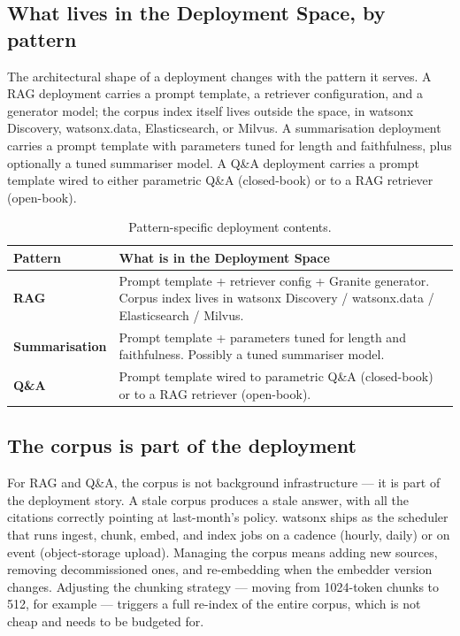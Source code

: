 \subsection{What lives in the Deployment Space, by pattern}

The architectural shape of a deployment changes with the pattern it serves. A RAG deployment carries a prompt template, a retriever configuration, and a generator model; the corpus index itself lives outside the space, in watsonx Discovery, watsonx.data, Elasticsearch, or Milvus. A summarisation deployment carries a prompt template with parameters tuned for length and faithfulness, plus optionally a tuned summariser model. A Q\&A deployment carries a prompt template wired to either parametric Q\&A (closed-book) or to a RAG retriever (open-book).

\begin{table}[h]
\centering
\small
\begin{tabularx}{\textwidth}{l X}
\toprule
\textbf{Pattern}       & \textbf{What is in the Deployment Space} \\
\midrule
\textbf{RAG}           & Prompt template + retriever config + Granite generator. Corpus index lives in watsonx Discovery / watsonx.data / Elasticsearch / Milvus. \\
\textbf{Summarisation} & Prompt template + parameters tuned for length and faithfulness. Possibly a tuned summariser model. \\
\textbf{Q\&A}          & Prompt template wired to parametric Q\&A (closed-book) or to a RAG retriever (open-book). \\
\bottomrule
\end{tabularx}
\caption{Pattern-specific deployment contents.}
\label{tab:pattern-deployments}
\end{table}

\subsection{The corpus is part of the deployment}

For RAG and Q\&A, the corpus is not background infrastructure --- it is part of the deployment story. A stale corpus produces a stale answer, with all the citations correctly pointing at last-month's policy. watsonx ships  as the scheduler that runs ingest, chunk, embed, and index jobs on a cadence (hourly, daily) or on event (object-storage upload). Managing the corpus means adding new sources, removing decommissioned ones, and re-embedding when the embedder version changes. Adjusting the chunking strategy --- moving from 1024-token chunks to 512, for example --- triggers a full re-index of the entire corpus, which is not cheap and needs to be budgeted for.

